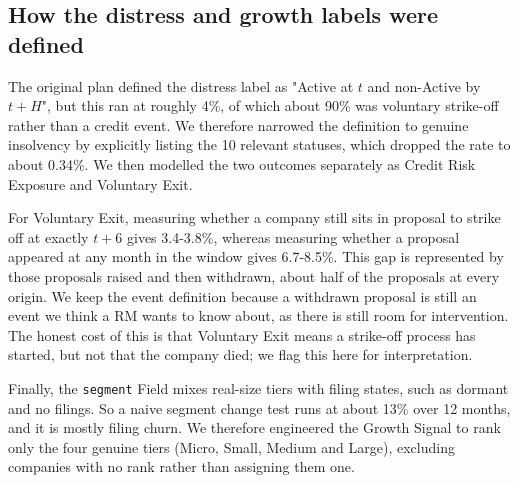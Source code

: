 \documentclass[    author={Samuel Menon Demelo; Sneha Saphala Ram Prasad; 
Viktor Ander Lindholm; Vishal Khatri},
               supervisor={Prof. Fernando Moreno-Pino},
                   degree={MSc},
                    title={Lloyds Commercial Banking Intelligence},
                 subtitle={Ranking SME Lending, Risk and Growth Prospects for Lloyds Banking Group},
                     type={},
                     year={2026}]{dissertation}
\begin{document}


\subsection{How the distress and growth labels were defined}
The original plan defined the distress label as "Active at $t$ and non-Active by $t+H$", but this ran at roughly 4\%, of which about 90\% was voluntary strike-off rather than a credit event. We therefore narrowed the definition to genuine insolvency by explicitly listing the 10 relevant statuses, which dropped the rate to about 0.34\%. We then modelled the two outcomes separately as Credit Risk Exposure and Voluntary Exit.

For Voluntary Exit, measuring whether a company still sits in proposal to strike off at exactly $t+6$ gives 3.4-3.8\%, whereas measuring whether a proposal appeared at any month in the window gives 6.7-8.5\%. This gap is represented by those proposals raised and then withdrawn, about half of the proposals at every origin. We keep the event definition because a withdrawn proposal is still an event we think a RM wants to know about, as there is still room for intervention. The honest cost of this is that Voluntary Exit means a strike-off process has started, but not that the company died; we flag this here for interpretation.

Finally, the \texttt{segment} Field mixes real-size tiers with filing states, such as dormant and no filings. So a naive segment change test runs at about 13\% over 12 months, and it is mostly filing churn. We therefore engineered the Growth Signal to rank only the four genuine tiers (Micro, Small, Medium and Large), excluding companies with no rank rather than assigning them one.
\end{document}
